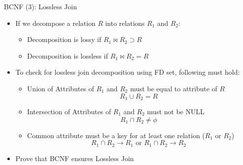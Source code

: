 \documentclass[aspectratio=169, xcolor=dvipsnames]{beamer}
\begin{document}
\begin{frame}{BCNF (3): Lossless Join}
    \begin{itemize}[<+->]
        \item If we decompose a relation $R$ into relations $R_1$ and $R_2$:
        \begin{itemize}
            \item[$\triangleright$] Decomposition is lossy if $R_1 \bowtie R_2 \supset R$
            \item[$\triangleright$] Decomposition is lossless if $R_1 \bowtie R_2 = R$
        \end{itemize}
        \item To check for lossless join decomposition using FD set, following must hold:
        \begin{itemize}
            \item[$\triangleright$] Union of Attributes of $R_1$ and $R_2$ must be equal to attribute of $R$
            \[ R_1 \cup R_2 = R \]
            \item[$\triangleright$] Intersection of Attributes of $R_1$ and $R_2$ must not be NULL
            \[ R_1 \cap R_2 \neq \phi \]
            \item[$\triangleright$] Common attribute must be a key for at least one relation ($R_1$ or $R_2$)
            \[ R_1 \cap R_2 \rightarrow R_1 \text{ or } R_1 \cap R_2 \rightarrow R_2 \]
        \end{itemize}
        \item Prove that BCNF ensures Lossless Join
    \end{itemize}
\end{frame}
\end{document}
